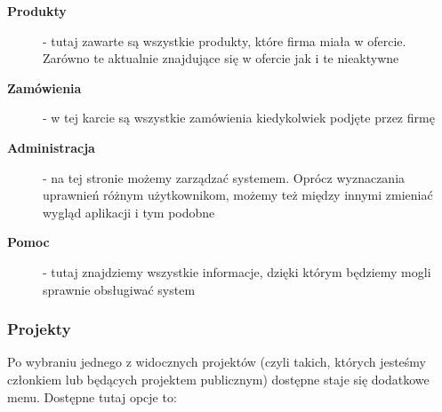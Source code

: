 \begin{description}
		\item[\textbf{Produkty}] - tutaj zawarte są wszystkie produkty, które firma miała w ofercie. Zarówno te aktualnie znajdujące się  w ofercie jak i te nieaktywne
					
		\item[\textbf{Zamówienia}] - w tej karcie są wszystkie zamówienia kiedykolwiek podjęte przez firmę
					
		\item[\textbf{Administracja}] - na tej stronie możemy zarządzać systemem. Oprócz wyznaczania uprawnień różnym użytkownikom, możemy też między innymi zmieniać wygląd aplikacji i tym podobne
					
		\item[\textbf{Pomoc}] - tutaj znajdziemy wszystkie informacje, dzięki którym będziemy mogli sprawnie obsługiwać system
	\end{description}
	
	\subsubsection{Projekty} 
		\par Po wybraniu jednego z widocznych projektów (czyli takich, których jesteśmy członkiem lub będących projektem publicznym) dostępne staje się dodatkowe menu. Dostępne tutaj opcje to:
	
